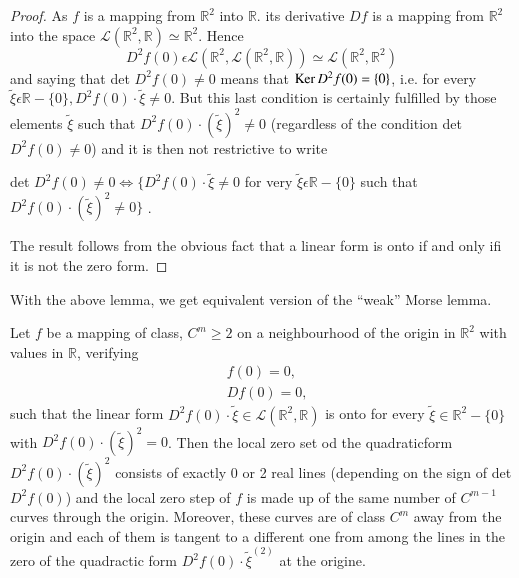 \begin{proof}
As $f$ is a mapping from $\mathbb{R}^{2}$ into $\mathbb{R}$. its derivative $Df$ is a mapping from $\mathbb{R}^{2}$ into the space $\mathscr{L} (\mathbb{R}^{2}, \mathbb{R}) \simeq \mathbb{R}^{2}$. Hence
$$
D^{2}f(0) \epsilon \mathscr{L} (\mathbb{R}^{2}, \mathscr{L} (\mathbb{R}^{2}, \mathbb{R})) \simeq \mathscr{L} (\mathbb{R}^{2}, \mathbb{R}^{2})
$$
and saying that det $D^{2}f(0) \neq 0$ means that $\operatorname{Ker} D^{2}f(0) = \{0\}$, i.e. for every $\widetilde{\xi} \epsilon \mathbb{R} - \{0\}, D^{2}f(0) \cdot \widetilde{\xi} \neq 0$. But this last condition is certainly fulfilled by those elements $\widetilde{\xi}$ such that $D^{2}f(0) \cdot (\widetilde{\xi})^{2} \neq 0$ (regardless of the condition det $D^{2}f(0) \neq 0$) and it is then not restrictive to write

det $D^{2}f(0) \neq 0 \Leftrightarrow \{D^{2}f(0) \cdot \widetilde{\xi} \neq 0$ for very $\widetilde{\xi} \epsilon \mathbb{R} - \{0\}$ such that $D^{2}f(0) \cdot (\widetilde{\xi})^{2} \neq 0\}$ .

The result follows from the obvious fact that a linear form is onto if and only ifi it is not the zero form.
\end{proof}

With the above lemma, we get equivalent version of the ``weak'' Morse lemma.

\begin{theorem*}[3.1$''$]\label{chap1-thm3.1''}
Let $f$ be a mapping of class, $C^{m} \geq 2$ on a neighbourhood of the origin in $\mathbb{R}^{2}$ with values in $\mathbb{R}$, verifying
\begin{align*}
& f(0) = 0,\\
& Df(0) = 0,
\end{align*}
such that the linear form $D^{2}f(0) \cdot \widetilde{\xi} \in \mathscr{L} (\mathbb{R}^{2}, \mathbb{R})$ is onto for every $\tilde{\xi} \in \mathbb{R}^2 - \{0\}$ with $D^2 f (0) \cdot (\tilde{\xi})^2 = 0$. Then the local zero set od the quadratic\pageoriginale form $D^{2}f(0) \cdot (\widetilde{\xi})^{2}$ consists of exactly 0 or 2 real lines (depending on the sign of det $D^{2}f(0)$) and the local zero step of $f$ is made up of the same number of $C^{m-1}$ curves through the origin. Moreover, these curves are of class $C^{m}$ away from the origin and each of them is tangent to a different one from among the lines in the zero of the quadractic form $D^{2}f(0) \cdot \widetilde{\xi}^(2)$ at the origine.
\end{theorem*}


